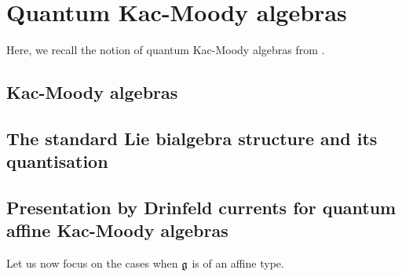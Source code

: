 \section{Quantum Kac-Moody algebras}
    Here, we recall the notion of quantum Kac-Moody algebras from \cite{etingof_kazhdan_quantisation_6}.

    \subsection{Kac-Moody algebras}
        

    \subsection{The standard Lie bialgebra structure and its quantisation}
        

    \subsection{Presentation by Drinfeld currents for quantum affine Kac-Moody algebras}
        Let us now focus on the cases when $\mathfrak{g}$ is of an affine type.
        
